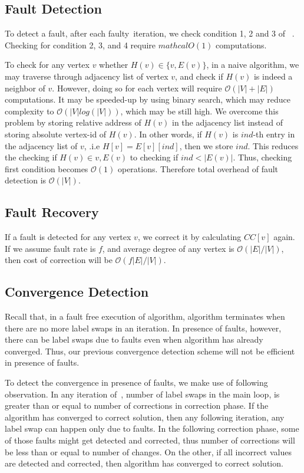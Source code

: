 \subsection{Fault Detection}
To detect a fault, after each faulty~\sv iteration, we check condition 1, 2 and 3 of ~. Checking for condition 2, 3, and 4 require $mathcal{O}(1)$ computations. 

 To check for any vertex $v$ whether $H(v) \in \{ v, E(v)\}$, in a naive algorithm, 
we may traverse through adjacency list of vertex $v$, and check if $H(v)$ is indeed a neighbor of $v$. However, doing so for each vertex will require $\mathcal{O}(|V|+|E|)$ computations. It may be speeded-up by using binary search, which may reduce complexity to $\mathcal{O}(|V|log(|V|))$, which may be still high. 
We  overcome this problem by storing relative address of $H(v)$ in the adjacency list instead of storing absolute vertex-id of $H(v)$.
 In other words, if $H(v)$ is $ind$-th entry in the adjacency list of $v$, .i.e $H[v]=E[v][ind]$, 
 then we store $ind$. This reduces the checking if $H(v)\in{v,E(v)}$ to checking if $ind<|E(v)|$.  Thus, checking first condition becomes $\mathcal{O}(1)$ operations. 
 Therefore total overhead of fault detection is  $\mathcal{O}(|V|)$.

\subsection{Fault Recovery}
If a fault is detected for any vertex $v$, we correct it by calculating $CC[v]$ again. 
If we assume fault rate is $f$, and average degree of any vertex is $\mathcal{O}(|E|/|V|)$, 
then cost of correction will be $\mathcal{O}(f|E|/|V|)$.

\subsection{Convergence Detection}
Recall that, in a fault free execution of \sv algorithm, algorithm terminates when there
are no more label swaps in an iteration. In presence of faults, however, there can be label
swaps due to faults even when algorithm has already converged. Thus, our previous 
convergence detection scheme will not be efficient in presence of faults. 

%
To detect the convergence in presence of faults, we make use of following observation. 
In any iteration of~, number of label swaps in the main loop, is greater 
than or equal to number of corrections in correction phase.  If the algorithm has converged to 
correct solution, then any following iteration, any label swap can happen only due to faults.
In the following correction phase, some of those faults might get detected and corrected, thus 
number of corrections will be less than or equal to number of changes. On the other, if all
incorrect values are detected and corrected, then algorithm has converged to correct solution.  

